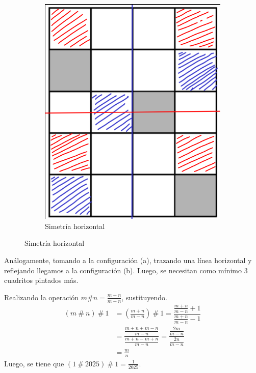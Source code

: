 \begin{solution}[(Problema 1)]
\begin{figure}[H]
\begin{subfigure}{0.27\textwidth}
            \includegraphics[width=\textwidth]{content/figure5}
            \caption{Simetría horizontal}
        \end{subfigure}
    \end{figure}
    Análogamente, tomando a la configuración (a), trazando una línea horizontal y reflejando llegamos a la configuración (b).
    Luego, se necesitan como mínimo 3 cuadritos pintados más.
\end{solution}

\begin{solution}[(Problema 2)]
    Realizando la operación $m \# n = \frac{m + n}{m - n}$, sustituyendo.
    \begin{align*}
        (m\ \#\ n)\ \#\ 1 &= \left(\frac{m + n}{m - n}\right)\ \# \ 1
        = \dfrac{\frac{m + n}{m - n} + 1}{\frac{m + n}{m - n} - 1}\\
        &= \dfrac{\frac{m + n + m - n}{m - n}}{\frac{m + n- m + n}{m - n}}
        = \dfrac{\frac{2m}{m - n}}{\frac{2n}{m - n}}\\
        &= \frac{m}{n}
    \end{align*}
    Luego, se tiene que $(1\ \#\ 2025)\ \#\ 1 = \frac{1}{2025}$.
\end{solution}

